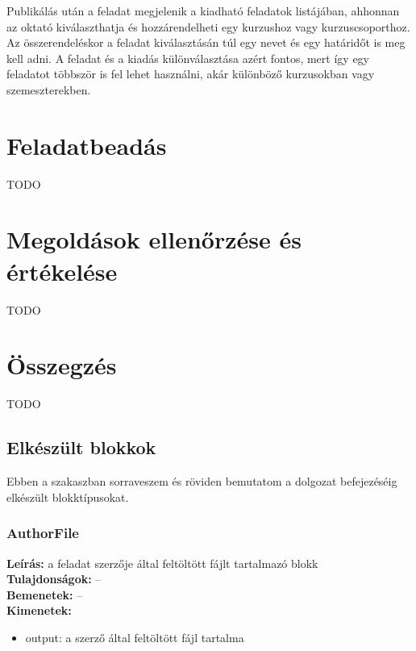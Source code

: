 Publikálás után a feladat megjelenik a kiadható feladatok listájában, ahhonnan az oktató kiválaszthatja és hozzárendelheti egy kurzushoz vagy kurzuscsoporthoz.
Az összerendeléskor a feladat kiválasztásán túl egy nevet és egy határidőt is meg kell adni.
A feladat és a kiadás különválasztása azért fontos, mert így egy feladatot többször is fel lehet használni, akár különböző kurzusokban vagy szemeszterekben.

\section{Feladatbeadás}
TODO

\section{Megoldások ellenőrzése és értékelése}\label{section:submission-evaluation}
TODO


\section{Összegzés}
TODO

\subsection{Elkészült blokkok}
Ebben a szakaszban sorraveszem és röviden bemutatom a dolgozat befejezéséig elkészült blokktípusokat.

\subsubsection{AuthorFile}
\textbf{Leírás:} a feladat szerzője által feltöltött fájlt tartalmazó blokk \\
\textbf{Tulajdonságok:} -- \\
\textbf{Bemenetek:} -- \\
\textbf{Kimenetek:}
\begin{itemize}
    \item output: a szerző által feltöltött fájl tartalma
\end{itemize}
        
